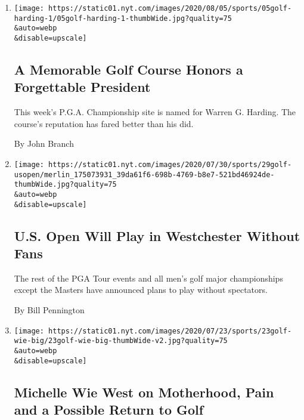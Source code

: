 \begin{enumerate}
\def\labelenumi{\arabic{enumi}.}
\item
  \href{/2020/08/05/sports/golf/pga-championship-harding-park.html}{}

  \texttt{[image: https://static01.nyt.com/images/2020/08/05/sports/05golf-harding-1/05golf-harding-1-thumbWide.jpg?quality=75\\\&auto=webp\\\&disable=upscale]}

  \hypertarget{a-memorable-golf-course-honors-a-forgettable-president}{%
  \subsection{A Memorable Golf Course Honors a Forgettable
  President}\label{a-memorable-golf-course-honors-a-forgettable-president}}

  This week's P.G.A. Championship site is named for Warren G. Harding.
  The course's reputation has fared better than his did.

  By John Branch
\item
  \href{/2020/07/29/sports/golf/us-open-westchester-without-fans.html}{}

  \texttt{[image: https://static01.nyt.com/images/2020/07/30/sports/29golf-usopen/merlin\_175073931\_39da61f6-698b-4769-b8e7-521bd46924de-thumbWide.jpg?quality=75\\\&auto=webp\\\&disable=upscale]}

  \hypertarget{us-open-will-play-in-westchester-without-fans}{%
  \subsection{U.S. Open Will Play in Westchester Without
  Fans}\label{us-open-will-play-in-westchester-without-fans}}

  The rest of the PGA Tour events and all men's golf major championships
  except the Masters have announced plans to play without spectators.

  By Bill Pennington
\item
  \href{/2020/07/24/sports/golf/michelle-wie-golf.html}{}

  \texttt{[image: https://static01.nyt.com/images/2020/07/23/sports/23golf-wie-big/23golf-wie-big-thumbWide-v2.jpg?quality=75\\\&auto=webp\\\&disable=upscale]}

  \hypertarget{michelle-wie-west-on-motherhood-pain-and-a-possible-return-to-golf}{%
  \subsection{Michelle Wie West on Motherhood, Pain and a Possible
  Return to
  Golf}\label{michelle-wie-west-on-motherhood-pain-and-a-possible-return-to-golf}}


\end{enumerate}
